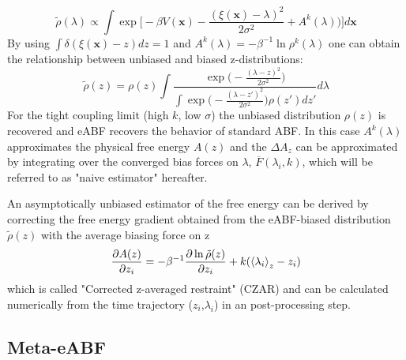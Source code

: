 \begin{equation}
  \tilde{\rho}(\lambda) \propto \int \exp \biggl[-\beta V(\textbf{x})-\frac{(\xi(\textbf{x})-\lambda)^2}{2\sigma^2} + A^{k}(\lambda) \biggr) \biggr] d\textbf{x}
\end{equation}
By using $\int \delta(\xi(\textbf{x})-z)dz=1$ and $A^k(\lambda)=-\beta^{-1}\ln\rho^k(\lambda)$ one can obtain the relationship between unbiased and biased z-distributions:
\begin{equation}
  \tilde{\rho}(z) =  \rho(z) \int \frac{\exp \bigl(-\frac{(\lambda-z)^2}{2\sigma^2}\bigr)}
  {\int \exp\bigl(-\frac{(\lambda-z')^2}{2\sigma^2}\bigr)\rho(z')dz'} d\lambda
\end{equation}
For the tight coupling limit (high $k$, low $\sigma$) the unbiased distribution $\rho(z)$ is recovered and eABF recovers the behavior of standard ABF. In this case $A^k(\lambda)$  approximates the physical free energy $A(z)$ and the $\Delta A_{z}$ can be approximated by integrating over the converged bias forces on $\lambda$, $\overline{F}(\lambda_{i}, k)$, which will be referred to as "naive estimator" hereafter.

An asymptotically unbiased estimator of the free energy can be derived by correcting the free energy gradient obtained from the eABF-biased distribution $\tilde{\rho}(z)$ with the average biasing force on z
\begin{equation}
  \frac{\partial A(z)}{\partial z_i} = -\beta^{-1}\frac{\partial \ln \tilde{\rho}(z)}{\partial z_i} + k(\braket{\lambda_i}_{z}-z_{i})
\end{equation}
which is called "Corrected z-averaged restraint" (CZAR) and can be calculated numerically from the time trajectory ($z_i$,$\lambda_i$) in an post-processing step.\autocite{lesage2017smoothed}

\subsection{Meta-eABF}
\label{sec:meta-eABF}
